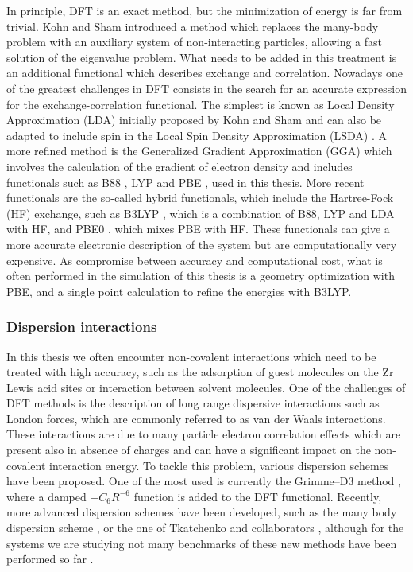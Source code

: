 In principle, DFT is an exact method, but the minimization of energy is far from trivial. Kohn and Sham \cite{Kohn1965} introduced a method which replaces the many-body problem with an auxiliary system of non-interacting particles, allowing a fast solution of the eigenvalue problem. What needs to be added in this treatment is an additional functional which describes exchange and correlation. Nowadays one of the greatest challenges in DFT consists in the search for an accurate expression for the exchange-correlation functional.
 The simplest is known as Local Density Approximation (LDA) initially proposed by Kohn and Sham \cite{Kohn1965} and can also be adapted to include spin in the Local Spin Density Approximation (LSDA) \cite{Vosko1980}. A more refined method is the Generalized Gradient Approximation (GGA) which involves the calculation of the gradient of electron density and includes functionals such as B88 \cite{Becke1988}, LYP \cite{Lee1988} and PBE \cite{Perdew1996, Perdew1997}, used in this thesis. 
 More recent functionals are the so-called hybrid functionals, which include the Hartree-Fock (HF) exchange, such as B3LYP \cite{Becke1988, Becke1993, Lee1988}, which is a combination of B88, LYP and LDA with HF, and PBE0 \cite{Adamo1999}, which mixes PBE with HF. These functionals can give a more accurate electronic description of the system but are computationally very expensive. As compromise between accuracy and computational cost, what is often performed in the simulation of this thesis is a geometry optimization with PBE, and a single point calculation to refine the energies with B3LYP.

\subsubsection{Dispersion interactions}
In this thesis we often encounter non-covalent interactions which need to be treated with high accuracy, such as the adsorption of guest molecules on the Zr Lewis acid sites or interaction between solvent molecules. One of the challenges of DFT methods is the description of long range dispersive interactions such as London forces, which are commonly referred to as van der Waals interactions. These interactions are due to many particle electron correlation effects which are present also in absence of charges and can have a significant impact on the non-covalent interaction energy. To tackle this problem, various dispersion schemes have been proposed. One of the most used is currently the Grimme--D3 method \cite{Grimme2010}, where a damped $-C_{6}R^{-6}$ function is added to the DFT functional. Recently, more advanced dispersion schemes have been developed, such as the many body dispersion scheme \cite{Buko2016}, or the one of Tkatchenko and collaborators \cite{Ambrosetti2014}, although for the systems we are studying not many benchmarks of these new methods have been performed so far  \cite{Wieme2018}.

